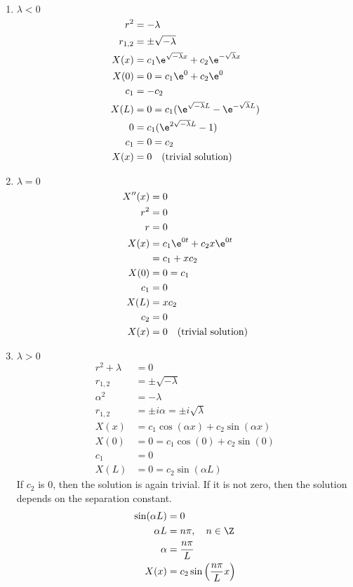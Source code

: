 \documentclass{math}
\begin{document}
\begin{enumerate}
  \item \( \lambda < 0 \)
  \begin{align*}
    r^2 &= -\lambda \\
    r_{1,2} &= \pm\sqrt{-\lambda} \\
    X(x) &= c_1\e^{\sqrt{-\lambda}x}+c_2\e^{-\sqrt{\lambda}x} \\
    X(0) &= 0 = c_1\e^{0}+c_2\e^{0} \\
    c_1 &= -c_2 \\
    X(L) &= 0 = c_1(\e^{\sqrt{-\lambda}L}-\e^{-\sqrt{\lambda}L}) \\
    0 &= c_1(\e^{2\sqrt{-\lambda}L}-1) \\
    c_1 &= 0 = c_2 \\
    X(x) &= 0 \quad \text{(trivial solution)}
  \end{align*}
  \item \( \lambda = 0 \)
  \begin{align*}
    X''(x) &= 0 \\
    r^2 &= 0 \\
    r &= 0 \\
    X(x) &= c_1\e^{0t}+c_2x\e^{0t} \\
    &= c_1+xc_2 \\
    X(0) &= 0 = c_1 \\
    c_1 &= 0 \\
    X(L) &= xc_2 \\
    c_2 &= 0 \\
    X(x) &= 0 \quad \text{(trivial solution)}
  \end{align*}
  \item \( \lambda > 0 \)
  \begin{align*}
    r^2+\lambda &= 0 \\
    r_{1,2} &= \pm\sqrt{-\lambda} \\
    \alpha^2 &= -\lambda \\
    r_{1,2} &= \pm i\alpha = \pm i\sqrt{\lambda} \\
    X(x) &= c_1\cos(\alpha x)+c_2\sin(\alpha x) \\
    X(0) &= 0 = c_1\cos(0)+c_2\sin(0) \\
    c_1 &= 0 \\
    X(L) &= 0 = c_2\sin(\alpha L)
  \end{align*}
  If \( c_2 \) is 0, then the solution is again trivial. If it is not zero,
  then the solution depends on the separation constant.
  \begin{align*}
    \sin(\alpha L) &= 0 \\
    \alpha L &= n\pi, \quad n\in\Z \\
    \alpha &= \frac{n\pi}{L} \\
    X(x) &= c_2\sin\left(\frac{n\pi}{L}x\right)
  \end{align*}
\end{enumerate}
\end{document}
